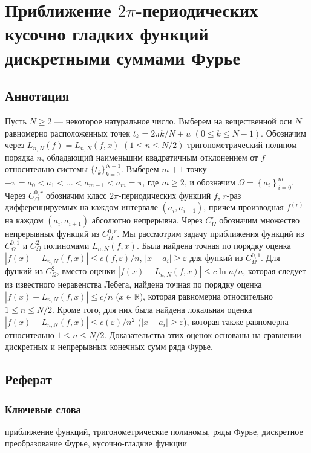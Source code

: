 \section{Приближение $2\pi$-периодических кусочно гладких функций дискретными суммами Фурье}

\subsection{Аннотация}
Пусть $N \geq 2$ --- некоторое натуральное число. Выберем на вещественной оси $N$ равномерно расположенных точек $t_k=2\pi k / N + u$ $(0 \leq k \leq N-1)$.
Обозначим через $L_{n,N}(f)=L_{n,N}(f,x)$ $(1\leq n\leq N/2)$ тригонометрический полином порядка $n$, обладающий наименьшим квадратичным отклонением от $f$ относительно системы $\{t_k\}_{k=0}^{N-1}$. Выберем $m+1$ точку $-\pi=a_{0}<a_{1}<\ldots<a_{m-1}<a_{m}=\pi$, где $m\geq 2$, и обозначим $\Omega=\left\{a_i\right\}_{i=0}^{m}$.
Через $C_{\Omega}^{0,r}$ обозначим класс $2\pi$-периодических функций $f$, $r$-раз дифференцируемых на каждом интервале  $(a_{i},a_{i+1})$, причем
производная $f^{(r)}$ на каждом $(a_{i},a_{i+1})$ абсолютно непрерывна.
Через $C^r_\Omega$ обозначим множество непрерывных функций из $C^{0,r}_\Omega$.
Мы рассмотрим задачу приближения функций из $C_{\Omega}^{0,1}$ и $C_{\Omega}^{2}$ полиномами $L_{n,N}(f,x)$.
Была найдена точная по порядку оценка
$\left|f(x) - L_{n,N}(f,x)\right| \leq c(f,\varepsilon)/n$, $\left|x - a_i\right| \geq \varepsilon$ для функий из $C_{\Omega}^{0,1}$.
Для функий из $C_{\Omega}^{2}$, вместо оценки $\left|f(x)-L_{n,N}(f,x)\right| \leq c\ln n/n$, которая следует из известного неравенства Лебега, найдена точная по порядку оценка $\left|f(x)-L_{n,N}(f,x)\right| \leq c/n$ ($x \in \mathbb{R}$), которая равномерна относительно $1 \leq n \leq N/2$.
Кроме того, для них была найдена локальная оценка $\left|f(x)-L_{n,N}(f,x)\right| \leq c(\varepsilon)/n^2$ ($\left|x - a_i\right| \geq \varepsilon$), которая также равномерна относительно $1 \leq n \leq N/2$.
Доказательства этих оценок основаны на сравнении дискретных и непрерывных конечных сумм ряда Фурье.

\subsection{Реферат}
\subsubsection{Ключевые слова}
приближение функций, 
тригонометрические полиномы, 
ряды Фурье, 
дискретное преобразование Фурье,
кусочно-гладкие функции
